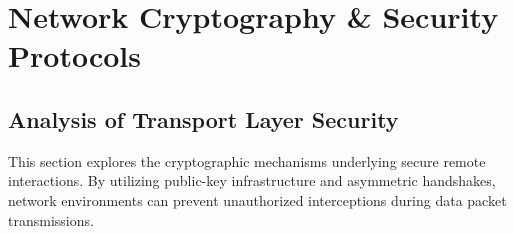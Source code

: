 \section{Network Cryptography \& Security Protocols}
\subsection{Analysis of Transport Layer Security}
This section explores the cryptographic mechanisms underlying secure remote interactions. 
By utilizing public-key infrastructure and asymmetric handshakes, network environments 
can prevent unauthorized interceptions during data packet transmissions.

